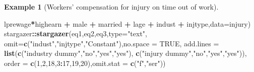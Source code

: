 \documentclass[
  12pt,
]{book}
\newenvironment{Shaded}{\begin{snugshade}}{\end{snugshade}}
\newcommand{\AttributeTok}[1]{\textcolor[rgb]{0.13,0.29,0.53}{#1}}
\newcommand{\ConstantTok}[1]{\textcolor[rgb]{0.56,0.35,0.01}{#1}}
\newcommand{\DecValTok}[1]{\textcolor[rgb]{0.00,0.00,0.81}{#1}}
\newcommand{\FunctionTok}[1]{\textcolor[rgb]{0.13,0.29,0.53}{\textbf{#1}}}
\newcommand{\NormalTok}[1]{#1}
\newcommand{\SpecialCharTok}[1]{\textcolor[rgb]{0.81,0.36,0.00}{\textbf{#1}}}
\newcommand{\StringTok}[1]{\textcolor[rgb]{0.31,0.60,0.02}{#1}}
\theoremstyle{definition}
\theoremstyle{definition}
\newtheorem{example}{Example}[chapter]
\theoremstyle{definition}
\theoremstyle{definition}
\theoremstyle{remark}
\begin{document}
\begin{example}[Workers' compensation for injury on time out of work]
\begin{Shaded}
\begin{Highlighting}[]
\NormalTok{            lprewage}\SpecialCharTok{*}\NormalTok{highearn }\SpecialCharTok{+}\NormalTok{ male }\SpecialCharTok{+}\NormalTok{ married }\SpecialCharTok{+}\NormalTok{ lage }\SpecialCharTok{+}\NormalTok{ indust }\SpecialCharTok{+}
\NormalTok{            injtype,}\AttributeTok{data=}\NormalTok{injury)}
\NormalTok{stargazer}\SpecialCharTok{::}\FunctionTok{stargazer}\NormalTok{(eq1,eq2,eq3,}\AttributeTok{type=}\StringTok{"text"}\NormalTok{,}
                     \AttributeTok{omit=}\FunctionTok{c}\NormalTok{(}\StringTok{"indust"}\NormalTok{,}\StringTok{"injtype"}\NormalTok{,}\StringTok{"Constant"}\NormalTok{),}\AttributeTok{no.space =} \ConstantTok{TRUE}\NormalTok{,}
                     \AttributeTok{add.lines =} \FunctionTok{list}\NormalTok{(}\FunctionTok{c}\NormalTok{(}\StringTok{"industry dummy"}\NormalTok{,}\StringTok{"no"}\NormalTok{,}\StringTok{"yes"}\NormalTok{,}\StringTok{"yes"}\NormalTok{),}
                                      \FunctionTok{c}\NormalTok{(}\StringTok{"injury dummy"}\NormalTok{,}\StringTok{"no"}\NormalTok{,}\StringTok{"yes"}\NormalTok{,}\StringTok{"yes"}\NormalTok{)),}
                     \AttributeTok{order =} \FunctionTok{c}\NormalTok{(}\DecValTok{1}\NormalTok{,}\DecValTok{2}\NormalTok{,}\DecValTok{18}\NormalTok{,}\DecValTok{3}\SpecialCharTok{:}\DecValTok{17}\NormalTok{,}\DecValTok{19}\NormalTok{,}\DecValTok{20}\NormalTok{),}\AttributeTok{omit.stat =} \FunctionTok{c}\NormalTok{(}\StringTok{"f"}\NormalTok{,}\StringTok{"ser"}\NormalTok{))}
\end{Highlighting}
\end{Shaded}


\end{example}
\end{document}
